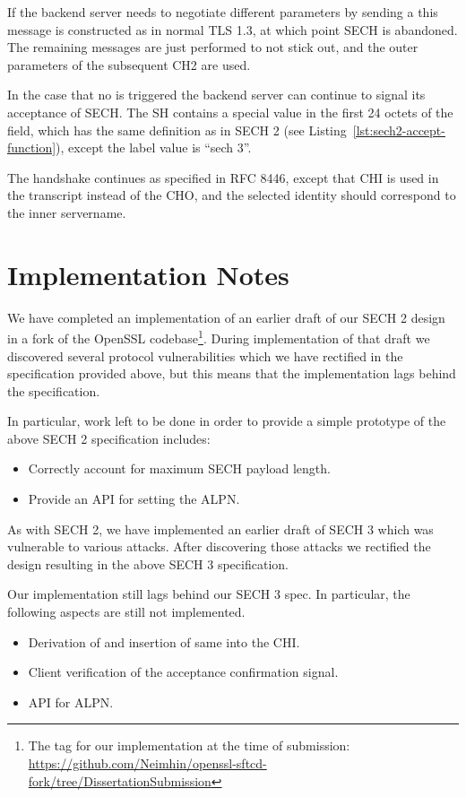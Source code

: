 If the backend server needs to negotiate different parameters by sending a
 this message is constructed as in normal \ac{TLS} 1.3,
at which point \ac{SECH} is abandoned.
The remaining messages are just performed to not stick out,
and the outer parameters of the subsequent \ac{CH2} are used.

In the case that no  is triggered the backend server can continue to signal
its acceptance of \ac{SECH}.
The \ac{SH} contains a special  value in the first 24 octets of the  field,
which has the same definition as in \ac{SECH} 2 (see Listing~\ref{lst:sech2-accept-function}), except the label value is ``sech 3''.

The handshake continues as specified in RFC 8446, except that \ac{CHI} is used in the transcript instead of the \ac{CHO},
and the selected identity should correspond to the inner servername.


\section{Implementation Notes}
We have completed an implementation of an earlier draft of
our \ac{SECH} 2 design in a fork of the OpenSSL codebase\footnote{The tag for our implementation at the time of submission: \url{https://github.com/Neimhin/openssl-sftcd-fork/tree/DissertationSubmission}}.
During implementation of that draft we discovered several protocol vulnerabilities
which we have
rectified in the specification provided above,
but this means that the implementation lags behind the specification.

In particular, work left to be done in order to provide a simple prototype of the above \ac{SECH} 2 specification includes:
\begin{itemize}
    \item Correctly account for maximum \ac{SECH} payload length.
    \item Provide an \ac{API} for setting the \ac{ALPN}.
\end{itemize}

As with \ac{SECH} 2, we have implemented an earlier draft of \ac{SECH} 3 which was vulnerable to
various attacks.
After discovering those attacks we rectified the design resulting in the above \ac{SECH} 3 specification.

Our implementation still lags behind our \ac{SECH} 3 spec. In particular, the following aspects are still not implemented.
\begin{itemize}
    \item Derivation of  and insertion of same into the \ac{CHI}.
    \item Client verification of the acceptance confirmation signal.
    \item \ac{API} for \ac{ALPN}.
\end{itemize}

